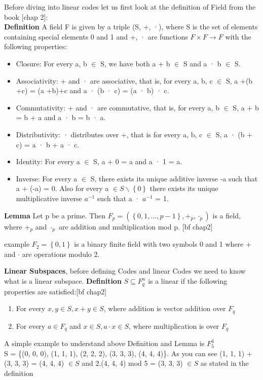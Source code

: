 Before diving into linear codes let us first look at the definition of Field from the book [chap 2]:\\
\textbf{Definition} A field F is given by a triple (S, +, ·), where S is the set of elements containing
special elements 0 and 1 and +, · are functions $F \times F \rightarrow F$ with the following properties:
\begin{itemize}
	\item Closure: For every a, b $\in$ S, we have both a + b $\in$ S and a · b $\in$ S.
	\item Associativity: + and · are associative, that is, for every a, b, c $\in$ S, a +(b +c) = (a +b)+c and a · (b · c) = (a · b) · c.
	\item Commutativity: + and · are commutative, that is, for every a, b $\in$ S, a + b = b + a and a · b = b · a.
	\item Distributivity: · distributes over +, that is for every a, b, c $\in$ S, a · (b + c) = a · b + a · c.
	\item Identity: For every a $\in$ S, a + 0 = a and a · 1 = a.
	\item Inverse: For every a $\in$ S, there exists its unique additive inverse -a such that a + (-a) = 0. Also for every a $\in S \backslash \left\{0\right\}$ there exists its unique multiplicative inverse $a^{-1}$ such that a · $a^{-1}$ = 1.
\end{itemize}

\textbf{Lemma} Let p be a prime. Then $F_p = (\left\{0, 1, . . . , p - 1\right\}, +_p , \cdot_p )$ is a field, where $+_p$ and $\cdot_p$ are
addition and multiplication mod p. [bf chap2]

example $F_2 = \left\{0,1\right\}$ is a binary finite field with two symbols 0 and 1 where + and $\cdot$ are operations modulo 2.

\textbf{Linear Subspaces},  before defining Codes and linear Codes we need to know what is a linear subspace.
\textbf{Definition} $ S \subseteq F_q^n $ is a linear if the following properties are satisfied:[bf chap2]
\begin{enumerate}
	\item For every $x,y \in S, x+y \in S$, where addition is vector addition over $F_q$
	\item For every $a \in F_q$ and $x \in S, a\cdot x\in S$, where multiplication is over $F_q$
\end{enumerate}

A simple example to understand above Definition and Lemma is $F_5^3$\\
S = \{(0, 0, 0), (1, 1, 1), (2, 2, 2), (3, 3, 3), (4, 4, 4)\}.
As you can see (1, 1, 1) + (3, 3, 3) = (4, 4, 4) $\in S$ and 2.(4, 4, 4) mod 5 = (3, 3, 3) $\in S$ as stated in the definition

